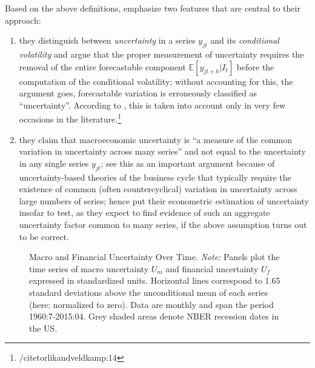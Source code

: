\documentclass[a4paper,11pt,listof=nochaptergap,oneside,pointednumbers,bibtotoc,bigheadings,liststotoc,hidelinks]{scrbook}
\theoremstyle{mysatz}
\theoremstyle{mydefinition}
\theoremstyle{mytheorem}
\theoremstyle{mybemerkung}
\begin{document}
Based on the above definitions, \citet{juradoetal:15} emphasize two features that are central to their approach:
\begin{enumerate}
	\item they distinguish between \textit{uncertainty} in a series $y_{jt}$ and its \textit{conditional volatility} and argue that the proper measurement of uncertainty requires the removal of the entire forecastable component $\mathbb{E}[y_{jt+h}|I_t]$ before the computation of the conditional volatility; without accounting for this, the argument goes, forecastable variation is erroneously classified as ``uncertainty''. According to \citet{juradoetal:15}, this is taken into account only in very few occasions in the literature.\footnote{/citet{orlikandveldkamp:14} }
	\item they claim that macroeconomic uncertainty is ``a measure of the common variation in uncertainty across many series'' and not equal to the uncertainty in any single series $y_{jt}$; \citet{juradoetal:15} see this as an important argument because of uncertainty-based theories of the business cycle that typically require the existence of common (often countercyclical) variation in uncertainty across large numbers of series; \citet{juradoetal:15} hence put their econometric estimation of uncertainty insofar to test, as they expect to find evidence of such an aggregate uncertainty factor common to many series, if the above assumption turns out to be correct.
\end{enumerate}

\begin{figure}[!ht]
   \centering
   \setlength\fboxsep{0pt}
   \setlength\fboxrule{0pt}
      \caption[Macro and Financial Uncertainty Over Time.]{Macro and Financial Uncertainty Over Time.
      \textit{Note:} Panels plot the time series of macro uncertainty $U_m$ and financial uncertainty $U_f$ expressed in standardized units. Horizontal lines correspond to 1.65 standard deviations above the unconditional mean of each series (here: normalized to zero). Data are monthly and span the period 1960:7-2015:04. Grey shaded areas denote NBER recession dates in the US.}   \label{fig:macroAndfinUncertainty_index}
\end{figure}
\end{document}
